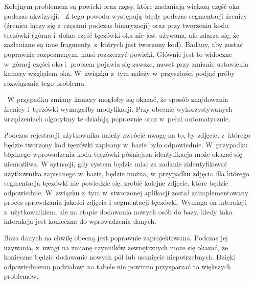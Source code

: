 Kolejnym problemem są powieki oraz rzęsy, które zasłaniają większą część oka podczas akwizycji. ~Z tego powodu występują błędy podczas segmentacji źrenicy (źrenica łączy się z~rzęsami podczas binaryzacji) oraz przy tworzeniu kodu tęczówki (górna i~dolna część tęczówki oka nie jest używana, ale zdarza się, że zasłaniane są inne fragmenty, z~których jest tworzony kod). Badany, aby zostać poprawnie rozpoznanym, musi rozszerzyć powieki. Głównie jest to widoczne w~górnej części oka i~problem pojawia się zawsze, nawet przy zmianie ustawienia kamery względem oka. W~związku z~tym należy w~przyszłości podjąć próby rozwiązania tego problemu.

~W przypadku zmiany kamery mogłoby się okazać, że sposób znajdowania źrenicy i~tęczówki wymagałby modyfikacji. Przy obecnie wykorzystywanych urządzeniach algorytmy te działają poprawnie oraz w~pełni automatycznie.

Podczas rejestracji użytkownika należy zwrócić uwagę na to, by zdjęcie, z~którego będzie tworzony kod tęczówki zapisany w~bazie było odpowiednie. W~przypadku błędnego wprowadzenia kodu tęczówki późniejsza identyfikacja może okazać się niemożliwa. W sytuacji, gdy system będzie miał za zadanie zidentyfikować użytkownika zapisanego w~bazie, będzie można, w~przypadku zdjęcia dla którego segmentacja tęczówki nie powiedzie się, zrobić kolejne zdjęcie, które będzie odpowiednie. W~związku z~tym w~stworzonej aplikacji został zaimplementowany proces sprawdzania jakości zdjęcia i~segmentacji tęczówki. Wymaga on interakcji z~użytkownikiem, ale na etapie dodawania nowych osób do bazy, kiedy taka interakcja jest konieczna do wprowadzenia danych.

Baza danych na chwilę obecną jest poprawnie zaprojektowana. Podczas jej używania, z~uwagi na zmianę czynników zewnętrznych może się okazać, że konieczne będzie dodawanie nowych pól lub usunięcie niepotrzebnych. Dzięki odpowiedniemu podziałowi na tabele nie powinno przysparzać to większych problemów.

